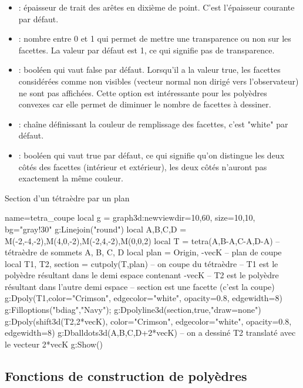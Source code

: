 \begin{itemize}
        \item {} : épaisseur de trait des arêtes en dixième de point. C'est l'épaisseur courante par défaut.
        \item {} : nombre entre 0 et 1 qui permet de mettre une transparence ou non sur les facettes. La valeur par défaut est 1, ce qui signifie pas de transparence.
        \item {} : booléen qui vaut false par défaut. Lorsqu'il a la valeur true, les facettes considérées comme non visibles (vecteur normal non dirigé vers l'observateur) ne sont pas affichées. Cette option est intéressante pour les polyèdres convexes car elle permet de diminuer le nombre de facettes à dessiner.
        \item {} : chaîne définissant la couleur de remplissage des facettes, c'est "white" par défaut.
        \item {} : booléen qui vaut true par défaut, ce qui signifie qu'on distingue les deux côtés des facettes (intérieur et extérieur), les deux côtés n'auront pas exactement la même couleur.
\end{itemize}

\begin{demo}{Section d'un tétraèdre par un plan}
\begin{luadraw}{name=tetra_coupe}
local g = graph3d:new{viewdir={10,60}, size={10,10}, bg="gray!30"}
g:Linejoin("round")
local A,B,C,D = M(-2,-4,-2),M(4,0,-2),M(-2,4,-2),M(0,0,2)
local T = tetra(A,B-A,C-A,D-A) -- tétraèdre de sommets A, B, C, D
local plan = {Origin, -vecK}  -- plan de coupe
local T1, T2, section = cutpoly(T,plan) -- on coupe du tétraèdre
-- T1 est le polyèdre résultant dans le demi espace contenant -vecK
-- T2 est le polyèdre résultant dans l'autre demi espace
-- section est une facette (c'est la coupe)
g:Dpoly(T1,{color="Crimson", edgecolor="white", opacity=0.8, edgewidth=8})
g:Filloptions("bdiag","Navy"); g:Dpolyline3d(section,true,"draw=none")
g:Dpoly(shift3d(T2,2*vecK), {color="Crimson", edgecolor="white", opacity=0.8, edgewidth=8})
g:Dballdots3d({A,B,C,D+2*vecK}) -- on a dessiné T2 translaté avec le vecteur 2*vecK
g:Show()
\end{luadraw}
\end{demo}

\subsection{Fonctions de construction de polyèdres}

